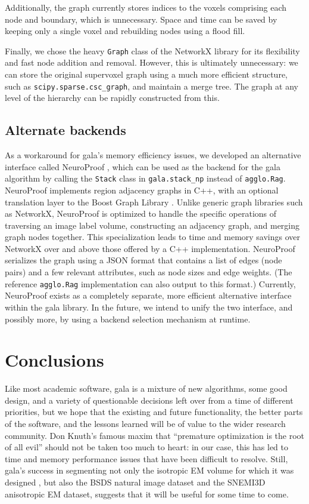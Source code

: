 \documentclass{frontiersSCNS} %
\begin{document}
Additionally, the graph currently stores indices to the voxels comprising each node and boundary, which is unnecessary.
Space and time can be saved by keeping only a single voxel and rebuilding nodes using a flood fill.

Finally, we chose the heavy \texttt{\small Graph} class of the NetworkX library for its flexibility and fast node addition and removal.
However, this is ultimately unnecessary: we can store the original supervoxel graph using a much more efficient structure, such as \texttt{\small scipy.sparse.csc\_graph}, and maintain a merge tree.
The graph at any level of the hierarchy can be rapidly constructed from this.

\subsection{Alternate backends}
\label{section:np}

As a workaround for gala's memory efficiency issues, we developed an alternative interface called NeuroProof \citep{np}, which can be used as the backend for the gala algorithm by calling the \texttt{\small Stack} class in \texttt{\small gala.stack\_np} instead of \texttt{\small agglo.Rag}.
NeuroProof implements region adjacency graphs in C++, with an optional translation layer to the Boost Graph Library \citep{bgl}.
Unlike generic graph libraries such as NetworkX, NeuroProof is optimized to handle the specific operations of traversing an image label volume, constructing an adjacency graph, and merging graph nodes together.
This specialization leads to time and memory savings over NetworkX over and above those offered by a C++ implementation.
NeuroProof serializes the graph using a JSON format that contains a list of edges (node pairs) and a few relevant attributes, such as node sizes and edge weights.
(The reference \texttt{\small agglo.Rag} implementation can also output to this format.)
Currently, NeuroProof exists as a completely separate, more efficient alternative interface within the gala library.
In the future, we intend to unify the two interface, and possibly more, by using a backend selection mechanism at runtime.

\section{Conclusions}

Like most academic software, gala is a mixture of new algorithms, some good design, and a variety of questionable decisions left over from a time of different priorities, but we hope that the existing and future functionality, the better parts of the software, and the lessons learned will be of value to the wider research community.
Don Knuth's famous maxim that ``premature optimization is the root of all evil'' \citep{knuth74opt} should not be taken too much to heart: in our case, this has led to time and memory performance issues that have been difficult to resolve.
Still, gala's success in segmenting not only the isotropic EM volume for which it was designed \citep{Glasner:2011uk, NunezIglesias:2013cd}, but also the BSDS natural image dataset and the SNEMI3D anisotropic EM dataset, suggests that it will be useful for some time to come.
\end{document}
